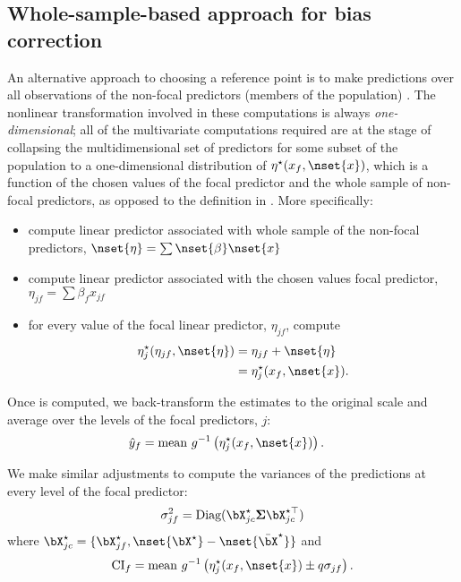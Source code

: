 \subsection{Whole-sample-based approach for bias correction}

An alternative approach to choosing a reference point is to make predictions over all observations of the non-focal predictors (members of the population) \citep{hanmer2013behind}. The nonlinear transformation involved in these computations is always \emph{one-dimensional}; all of the multivariate computations required are at the stage of collapsing the multidimensional set of predictors for some subset of the population to a one-dimensional distribution of $\eta^\star(x_f, \nset{x})$, which is a function of the chosen values of the focal predictor and the whole sample of non-focal predictors, as opposed to the definition in . More specifically:
\begin{itemize}
\item compute linear predictor associated with whole sample of the non-focal predictors, $\nset{\eta} = \sum \nset{\beta} \nset{x}$
\item compute linear predictor associated with the chosen values focal predictor, $\eta_{jf} = \sum{\beta_f x_{jf}}$
\item for every value of the focal linear predictor, $\eta_{jf}$, compute
%
\begin{align}\label{eq:pop_eta} 
\eta_j^\star(\eta_{jf}, \nset{\eta})  &= \eta_{jf} + \nset{\eta} \nonumber \\
&= \eta_j^\star(x_f, \nset{x}).
\end{align}
\end{itemize}
%

Once  is computed, we back-transform the estimates to the original scale and average over the levels of the focal predictors, $j$:
%
\begin{align}\label{eq:pop_response} 
\hat{y}_f  &= \textrm{mean} ~ g^{-1} \left(\eta_j^\star(x_f, \nset{x})\right).
\end{align}
%

We make similar adjustments to compute the variances of the predictions at every level of the focal predictor:
%
\begin{align}
\sigma_{jf}^2 = \textrm{Diag}(\bX^\star_{jc} \boldsymbol{\Sigma} \bX^{\star\top}_{jc})
\end{align}
where $\bX^{\star}_{jc} = \{\bX_{jf}^\star, \nset{{\bX}^\star} - \nset{{\bar{\bX}}^\star}\}$ and 
%
\begin{align}
\mathrm{CI}_f = \mathrm{mean} ~ g^{-1} \left(\eta_j^\star(x_f, \nset{x}) \pm q\sigma_{jf}\right).
\end{align}
%

